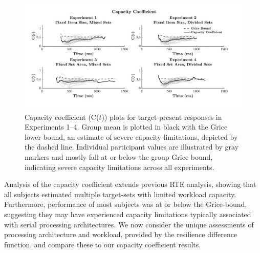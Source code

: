 \begin{figure}[tbh]
\centering \includegraphics[width=\linewidth]{Figures/EstSystems/FIG8JPG.pdf}
\caption{Capacity coefficient (C($t$)) plots for target-present responses in Experiments 1--4. Group mean \Ct is plotted in black with the Grice lower-bound, an estimate of severe capacity limitations, depicted by the dashed line. Individual participant \Ct values are illustrated by gray markers and mostly fall at or below the group Grice bound, indicating severe capacity limitations across all experiments.}
\label{fig:GroupCapacity}
\end{figure}

Analysis of the capacity coefficient extends previous RTE analysis, showing that all subjects estimated multiple target-sets with limited workload capacity. Furthermore, performance of most subjects was at or below the Grice-bound, suggesting they may have experienced capacity limitations typically associated with serial processing architectures. We now consider the unique assessments of processing architecture and workload, provided by the resilience difference function, and compare these to our capacity coefficient results. 

